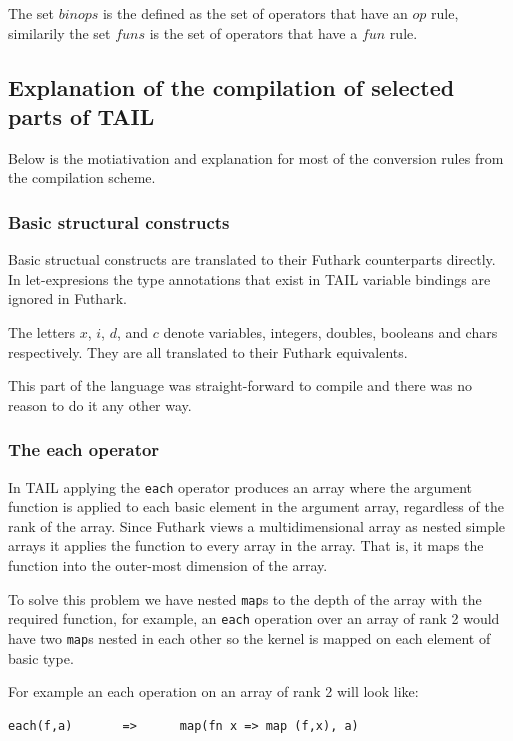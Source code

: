 \documentclass[11pt]{article}
\begin{document}
The set $binops$ is the defined as the set of operators that have an $op$ rule, similarily the set $funs$ is the set of
operators that have a $fun$ rule.

\subsection{Explanation of the compilation of selected parts of TAIL}
Below is the motiativation and explanation for most of the conversion rules from the compilation scheme. 

\subsubsection{Basic structural constructs} 
Basic structual constructs are translated to their Futhark counterparts directly.
In let-expresions the type annotations that exist in TAIL variable bindings are ignored in Futhark. 

The letters $x$, $i$, $d$, and $c$ denote variables, integers, doubles, booleans and chars respectively.
They are all translated to their Futhark equivalents.

This part of the language was straight-forward to compile and there was no reason to do it any other way.

\subsubsection{The each operator} 

In TAIL applying the {\tt each} operator produces an array where the argument function is applied to each basic element in the
argument array, regardless of the rank of the array.
Since Futhark views a multidimensional array as nested simple arrays it applies the function to every array in the array.
That is, it maps the function into the outer-most dimension of the array\cite{TroelsHenriksen}.
 
To solve this problem we have nested {\tt map}s to the depth of the array with the required function,
for example, an {\tt each} operation over an array of rank 2 would have two {\tt map}s nested in each other so the kernel is
mapped on each element of basic type.
 
For example an each operation on an array of rank 2 will look like:
\begin{lstlisting}[numbers=none,frame=none]
each(f,a)       =>      map(fn x => map (f,x), a)
\end{lstlisting}
\end{document}
